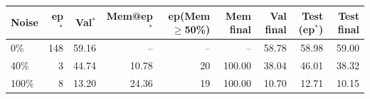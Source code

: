 \begin{tabular}{lrrrrrrrr}
\toprule
Noise & ep$^*$ & Val$^*$ & Mem@ep$^*$ & ep(Mem$\geq$50\%) & Mem final & Val final & Test (ep$^*$) & Test final \\
\midrule
0\% & 148 & 59.16 & -- & -- & -- & 58.78 & 58.98 & 59.00 \\
40\% & 3 & 44.74 & 10.78 & 20 & 100.00 & 38.04 & 46.01 & 38.32 \\
100\% & 8 & 13.20 & 24.36 & 19 & 100.00 & 10.70 & 12.71 & 10.15 \\
\bottomrule
\end{tabular}
